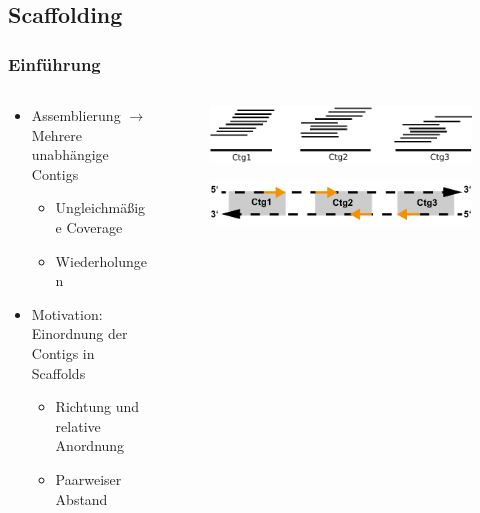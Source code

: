 \documentclass[xcolor=pst]{beamer}
\begin{document}
\subsection{Scaffolding}
\begin{frame}
\setcounter{framenumber}{1}
  \frametitle{Einführung}

  \begin{columns}
    \begin{column}{.45\textwidth}
      \begin{itemize}
      \item Assemblierung $\rightarrow$ Mehrere unabhängige Contigs
      \begin{itemize}
        \item Ungleichmäßige Coverage
        \item Wiederholungen
      \end{itemize}
      \item Motivation: Einordnung der Contigs in Scaffolds
      \begin{itemize}
        \item Richtung und relative Anordnung
        \item Paarweiser Abstand
      \end{itemize}
      \end{itemize}
    \end{column}
    \begin{column}{.45\textwidth}
      \begin{center}
        \begin{figure}[t]
          \includegraphics[width=\textwidth,height=0.8\textheight,keepaspectratio]{figures/Scaffolding.pdf}
        \end{figure}
        \vspace{.75cm}
        \begin{figure}[t]
          \includegraphics[width=\textwidth,height=0.8\textheight,keepaspectratio]{figures/Scaffolding_2.pdf}
        \end{figure}
      \end{center}
    \end{column}
  \end{columns}
\end{frame}
\end{document}
